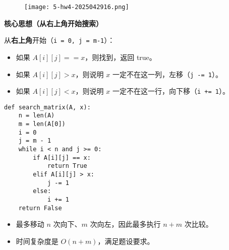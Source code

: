 \begin{exercise}
\begin{figure}[H]
\centering
\texttt{[image: 5-hw4-2025042916.png]}
\label{}
\end{figure}
\end{exercise}
\textbf{核心思想（从右上角开始搜索）}

从\textbf{右上角}开始（\lstinline{i = 0, j = m-1}）：

\begin{itemize}
	\item 如果 $A[i][j] == x$，则找到，返回 true。
	\item 如果 $A[i][j] > x$，则说明 $x$ 一定不在这一列，左移（\lstinline{j -= 1}）。
	\item 如果 $A[i][j] < x$，则说明 $x$ 一定不在这一行，向下移（\lstinline{i += 1}）。
\end{itemize}

\begin{lstlisting}
def search_matrix(A, x):
    n = len(A)
    m = len(A[0])
    i = 0
    j = m - 1
    while i < n and j >= 0:
        if A[i][j] == x:
            return True
        elif A[i][j] > x:
            j -= 1
        else:
            i += 1
    return False

\end{lstlisting}
\begin{itemize}
	\item 最多移动 $n$ 次向下、$m$ 次向左，因此最多执行 $n + m$ 次比较。
	\item 时间复杂度是 $\boxed{O(n + m)}$，满足题设要求。
\end{itemize}
